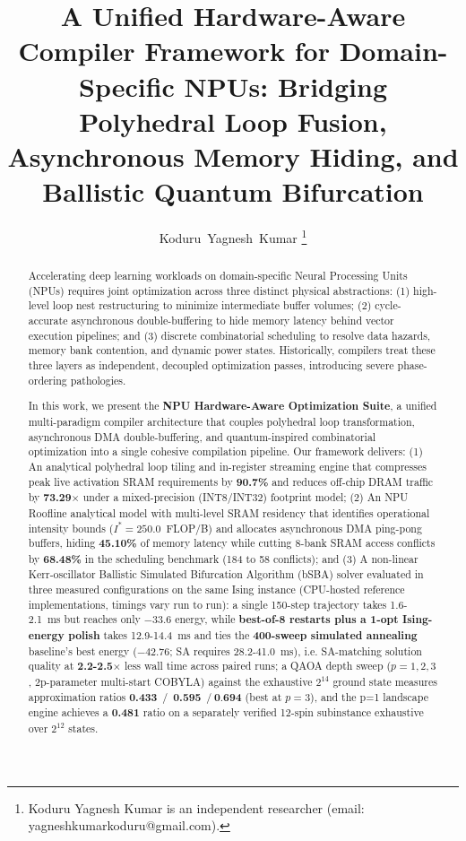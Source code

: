 ﻿\documentclass[journal]{IEEEtran}
\begin{document}
\title{A Unified Hardware-Aware Compiler Framework for Domain-Specific NPUs: Bridging Polyhedral Loop Fusion, Asynchronous Memory Hiding, and Ballistic Quantum Bifurcation}

\author{Koduru~Yagnesh~Kumar%
\thanks{Koduru Yagnesh Kumar is an independent researcher (email: yagneshkumarkoduru@gmail.com).}}

\maketitle

\begin{abstract}
Accelerating deep learning workloads on domain-specific Neural Processing Units (NPUs) requires joint optimization across three distinct physical abstractions: (1) high-level loop nest restructuring to minimize intermediate buffer volumes; (2) cycle-accurate asynchronous double-buffering to hide memory latency behind vector execution pipelines; and (3) discrete combinatorial scheduling to resolve data hazards, memory bank contention, and dynamic power states. Historically, compilers treat these three layers as independent, decoupled optimization passes, introducing severe phase-ordering pathologies.

In this work, we present the \textbf{NPU Hardware-Aware Optimization Suite}, a unified multi-paradigm compiler architecture that couples polyhedral loop transformation, asynchronous DMA double-buffering, and quantum-inspired combinatorial optimization into a single cohesive compilation pipeline. Our framework delivers:
(1) An analytical polyhedral loop tiling and in-register streaming engine that compresses peak live activation SRAM requirements by \textbf{90.7\%} and reduces off-chip DRAM traffic by \textbf{73.29}$\times$ under a mixed-precision (INT8/INT32) footprint model;
(2) An NPU Roofline analytical model with multi-level SRAM residency that identifies operational intensity bounds ($I^* = 250.0$~FLOP/B) and allocates asynchronous DMA ping-pong buffers, hiding \textbf{45.10\%} of memory latency while cutting 8-bank SRAM access conflicts by \textbf{68.48\%} in the scheduling benchmark (184 to 58 conflicts); and
(3) A non-linear Kerr-oscillator Ballistic Simulated Bifurcation Algorithm (bSBA) solver evaluated in three measured configurations on the same Ising instance (CPU-hosted reference implementations, timings vary run to run): a single 150-step trajectory takes 1.6-2.1~ms but reaches only $-33.6$ energy, while \textbf{best-of-8 restarts plus a 1-opt Ising-energy polish} takes 12.9-14.4~ms and ties the \textbf{400-sweep simulated annealing} baseline's best energy ($-42.76$; SA requires 28.2-41.0~ms), i.e. SA-matching solution quality at \textbf{2.2-2.5}$\times$ less wall time across paired runs; a QAOA depth sweep ($p=1,2,3$, 2p-parameter multi-start COBYLA) against the exhaustive $2^{14}$ ground state measures approximation ratios \textbf{0.433}~/~\textbf{0.595}~$/~\textbf{0.694}$ (best at $p=3$), and the p=1 landscape engine achieves a \textbf{0.481} ratio on a separately verified 12-spin subinstance exhaustive over $2^{12}$ states.


\end{abstract}
\end{document}
